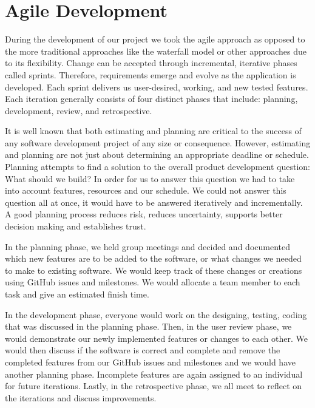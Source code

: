\section{Agile Development}
During the development of our project we took the agile approach as opposed to the more traditional approaches like the waterfall model or other approaches due to its flexibility. Change can be accepted through incremental, iterative phases called sprints. Therefore, requirements emerge and evolve as the application is developed. Each sprint delivers us user-desired, working, and new tested features. Each iteration generally consists of four distinct phases that include: planning, development, review, and retrospective.\par
It is well known that both estimating and planning are critical to the success of any software development project of any size or consequence. However, estimating and planning are not just about determining an appropriate deadline or schedule. Planning attempts to find a solution to the overall product development question: What should we build? In order for us to answer this question we had to take into account features, resources and our schedule. We could not answer this question all at once, it would have to be answered iteratively and incrementally. A good planning process reduces risk, reduces uncertainty, supports better decision making and establishes trust\cite{MikeCohn}.\par
In the planning phase, we held group meetings and decided and documented which new features are to be added to the software, or what changes we needed to make to existing software. We would keep track of these changes or creations using GitHub issues and milestones. We would allocate a team member to each task and give an estimated finish time. \par
In the development phase, everyone would work on the designing, testing, coding that was discussed in the planning phase. Then, in the user review phase, we would demonstrate our newly implemented features or changes to each other. We would then discuss if the software is correct and complete and remove the completed features from our GitHub issues and milestones and we would have another planning phase. Incomplete features are again assigned to an individual for future iterations. Lastly, in the retrospective phase, we all meet to reflect on the iterations and discuss improvements\cite{ChrisGeorge}.


